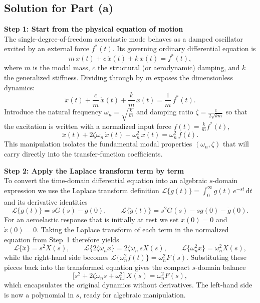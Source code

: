 \documentclass[12pt]{article}
\begin{document}
\subsection*{Solution for Part (a)}

\begin{stepbox}
\textbf{Step 1: Start from the physical equation of motion}\\[0.5em]
The single-degree-of-freedom aeroelastic mode behaves as a damped oscillator excited by an external force $f^\ast(t)$. Its governing ordinary differential equation is
\[
m\,\ddot{x}(t) + c\,\dot{x}(t) + k\,x(t) = f^\ast(t),
\]
where $m$ is the modal mass, $c$ the structural (or aerodynamic) damping, and $k$ the generalized stiffness.  Dividing through by $m$ exposes the dimensionless dynamics:
\[
\ddot{x}(t) + \frac{c}{m}\,\dot{x}(t) + \frac{k}{m}\,x(t) = \frac{1}{m}\,f^\ast(t).
\]
Introduce the natural frequency $\omega_n = \sqrt{\tfrac{k}{m}}$ and damping ratio $\zeta = \tfrac{c}{2\sqrt{km}}$ so that the excitation is written with a normalized input force $f(t)=\tfrac{k}{m}f^\ast(t)$,
\[
\ddot{x}(t) + 2\zeta\omega_n\,\dot{x}(t) + \omega_n^2\,x(t) = \omega_n^2\,f(t).
\]
This manipulation isolates the fundamental modal properties $(\omega_n,\zeta)$ that will carry directly into the transfer-function coefficients.
\end{stepbox}

\begin{stepbox}
\textbf{Step 2: Apply the Laplace transform term by term}\\[0.5em]
To convert the time-domain differential equation into an algebraic $s$-domain expression we use the Laplace transform definition $\mathcal{L}\{g(t)\} = \int_0^{\infty} g(t)\,e^{-st}\,\mathrm{d}t$ and its derivative identities
\[
\mathcal{L}\{\dot{g}(t)\} = sG(s) - g(0), \qquad
\mathcal{L}\{\ddot{g}(t)\} = s^2 G(s) - s g(0) - \dot{g}(0).
\]
For an aeroelastic response that is initially at rest we set $x(0)=0$ and $\dot{x}(0)=0$.  Taking the Laplace transform of each term in the normalized equation from Step~1 therefore yields
\[
\mathcal{L}\{\ddot{x}\} = s^2 X(s), \qquad
\mathcal{L}\{2\zeta\omega_n \dot{x}\} = 2\zeta\omega_n\, s X(s), \qquad
\mathcal{L}\{\omega_n^2 x\} = \omega_n^2 X(s),
\]
while the right-hand side becomes $\mathcal{L}\{\omega_n^2 f(t)\} = \omega_n^2 F(s)$.  Substituting these pieces back into the transformed equation gives the compact $s$-domain balance
\[
\big[s^2 + 2\zeta\omega_n s + \omega_n^2\big]\,X(s) = \omega_n^2 F(s),
\]
which encapsulates the original dynamics without derivatives.  The left-hand side is now a polynomial in $s$, ready for algebraic manipulation.
\end{stepbox}
\end{document}
